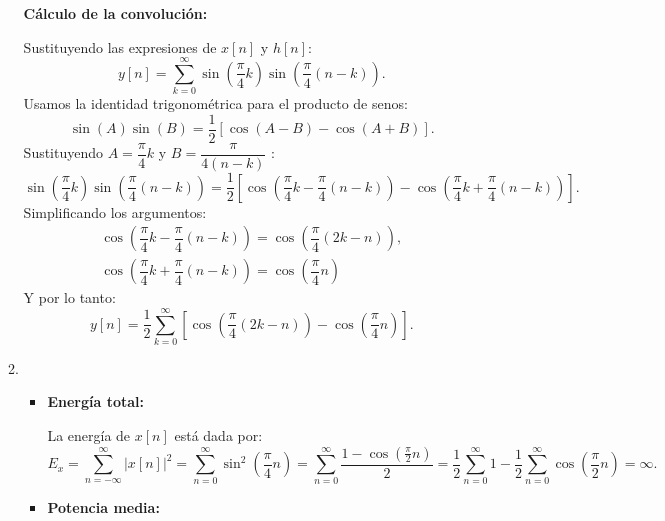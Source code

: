\begin{enumerate}[label=\color{red}\textbf{\arabic*)}]
\begin{enumerate}[label=\color{red}\textbf{\alph*)}]
            \textbf{Cálculo de la convolución:}

            Sustituyendo las expresiones de $x[n]$ y  $h[n]$:  \[
                y[n]=\sum_{k=0}^{\infty} \sin\left( \dfrac{\pi}{4}k \right) \sin\left( \dfrac{\pi}{4}(n-k) \right) .
            \] 
            Usamos la identidad trigonométrica para el producto de senos:
            \[
                \sin(A)\sin(B)=\dfrac{1}{2}[\cos(A-B)-\cos(A+B)].
            \] 
            Sustituyendo $A=\dfrac{\pi}{4}k$ y $B=\dfrac{\pi}{4(n-k)}$ : \[
            \sin\left( \dfrac{\pi}{4}k \right) \sin\left( \dfrac{\pi}{4}(n-k) \right) =\dfrac{1}{2}\left[ \cos\left( \dfrac{\pi}{4}k-\dfrac{\pi}{4}(n-k) \right) -\cos\left( \dfrac{\pi}{4}k +\dfrac{\pi}{4}(n-k)\right)  \right] .
            \] 
            Simplificando los argumentos: \[
            \begin{array}{c}
                \cos\left( \dfrac{\pi}{4}k-\dfrac{\pi}{4}(n-k) \right) =\cos\left( \dfrac{\pi}{4}(2k-n) \right) ,\\
                \cos\left( \dfrac{\pi}{4}k+\dfrac{\pi}{4}(n-k) \right) =\cos\left( \dfrac{\pi}{4}n \right) 
            \end{array}
            \] 
            Y por lo tanto: \[
                y[n]=\dfrac{1}{2}\sum_{k=0}^{\infty} \left[ \cos\left( \dfrac{\pi}{4}(2k-n) \right) -\cos\left( \dfrac{\pi}{4}n \right)  \right] .
            \] 
        \item {} 

            \begin{itemize}[label=\textbullet]
                \item \textbf{Energía total:}

                    La energía de $x[n]$ está dada por:  \[
                        E_x=\sum_{n=-\infty}^{\infty} |x[n]|^2=\sum_{n=0}^{\infty} \sin^2\left( \dfrac{\pi}{4}n \right) =\sum_{n=0}^{\infty} \dfrac{1-\cos\left( \frac{\pi}{2} n \right) }{2}=\dfrac{1}{2}\sum_{n=0}^{\infty} 1-\dfrac{1}{2}\sum_{n=0}^{\infty} \cos\left( \dfrac{\pi}{2}n \right) =\infty.
                    \] 
                \item \textbf{Potencia media:}


\end{itemize}
\end{enumerate}
\end{enumerate}
